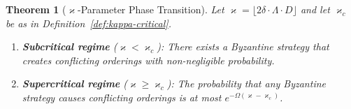 \documentclass[11pt,a4paper]{article}
\newtheorem{theorem}{Theorem}[section]
\theoremstyle{definition}
\theoremstyle{remark}
\renewcommand{\kappa}{\varkappa}
\begin{document}
\begin{theorem}[$\kappa$-Parameter Phase Transition]\label{thm:kappa}
Let $\kappa = \lfloor 2\delta \cdot \Lambda \cdot D \rfloor$ and let
$\kappa_c$ be as in Definition~\ref{def:kappa-critical}.

\begin{enumerate}[label=(\roman*)]
  \item \textbf{Subcritical regime} ($\kappa < \kappa_c$): There exists
    a Byzantine strategy that creates conflicting orderings with
    non-negligible probability.

  \item \textbf{Supercritical regime} ($\kappa \geq \kappa_c$): The
    probability that any Byzantine strategy causes conflicting orderings
    is at most $e^{-\Omega(\kappa - \kappa_c)}$.
\end{enumerate}
\end{theorem}
\end{document}
